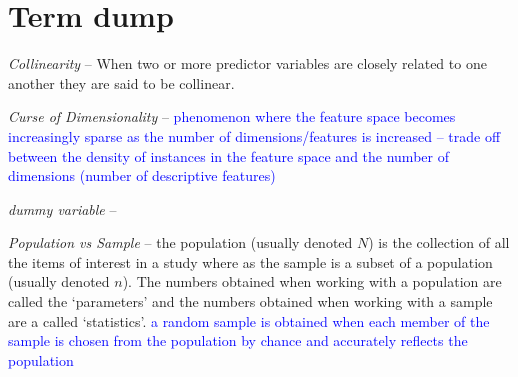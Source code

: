 \chapter{Term dump}

\emph{Collinearity} -- When two or more predictor variables are closely related to one another they are said to be collinear.

\emph{Curse of Dimensionality} -- \textcolor{blue}{phenomenon where the feature space becomes increasingly sparse as the number of dimensions/features is increased -- trade off between the density of instances in the feature space and the number of dimensions (number of descriptive features)}

\emph{dummy variable} --


\emph{Population vs Sample} -- the population (usually denoted $N$) is the collection of all the items of interest in a study where as the sample is a subset of a population (usually denoted $n$). The numbers obtained when working with a population are called the `parameters' and the numbers obtained when working with a sample are a called `statistics'. \textcolor{blue}{a random sample is obtained when each member of the sample is chosen from the population by chance and accurately reflects the population}